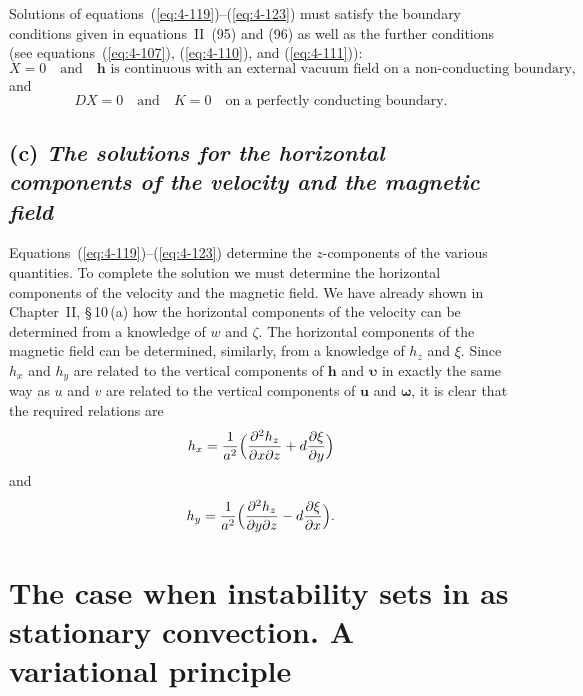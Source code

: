 Solutions of equations~(\ref{eq:4-119})--(\ref{eq:4-123}) must satisfy the boundary conditions given in equations~II~(95) and (96) as well as the further conditions (see equations~(\ref{eq:4-107}), (\ref{eq:4-110}), and (\ref{eq:4-111})):
\begin{equation}
\label{eq:4-124}
X = 0 \quad\text{and}\quad \mathbf{h}\text{ is continuous with an external vacuum field on a non-conducting boundary,}
\end{equation}
and
\begin{equation}
\label{eq:4-125}
DX = 0 \quad\text{and}\quad K = 0 \quad \text{on a perfectly conducting boundary.}
\end{equation}

\subsection*{(c) \emph{The solutions for the horizontal components of the velocity and the magnetic field}}

Equations~(\ref{eq:4-119})--(\ref{eq:4-123}) determine the $z$-components of the various quantities. To complete the solution we must determine the horizontal components of the velocity and the magnetic field. We have already shown in Chapter~II, \S\,10\,(a) how the horizontal components of the velocity can be determined from a knowledge of $w$ and $\zeta$. The horizontal components of the magnetic field can be determined, similarly, from a knowledge of $h_z$ and $\xi$. Since $h_x$ and $h_y$ are related to the vertical components of $\mathbf{h}$ and $\boldsymbol{\upsilon}$ in exactly the same way as $u$ and $v$ are related to the vertical components of $\mathbf{u}$ and $\boldsymbol{\omega}$, it is clear that the required relations are
\begin{equation}
\label{eq:4-126}
h_x = \frac{1}{a^2}\Bigl(\frac{\partial^2 h_z}{\partial x\partial z}+d\frac{\partial\xi}{\partial y}\Bigr)
\end{equation}
and
\begin{equation}
\label{eq:4-127}
h_y = \frac{1}{a^2}\Bigl(\frac{\partial^2 h_z}{\partial y\partial z}-d\frac{\partial\xi}{\partial x}\Bigr).
\end{equation}

\section{The case when instability sets in as stationary convection. A variational principle}\label{sec:43}

